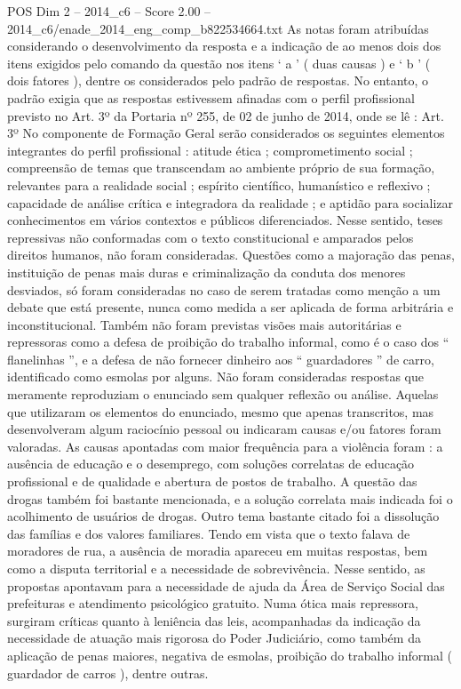\begin{textsample}{POS Dim 2 – 2014\_c6 – Score 2.00 – 2014\_c6/enade\_2014\_eng\_comp\_b822534664.txt}
As notas foram atribuídas considerando o desenvolvimento da resposta e a indicação de ao menos dois dos itens exigidos pelo comando da questão nos itens ‘ a ’ ( duas causas ) e ‘ b ’ ( dois fatores ), dentre os considerados pelo padrão de respostas.
No entanto, o padrão exigia que as respostas estivessem afinadas com o perfil profissional previsto no Art. 3º da Portaria nº 255, de 02 de junho de 2014, onde se lê : Art. 3º No componente de Formação Geral serão considerados os seguintes elementos integrantes do perfil profissional : atitude ética ; comprometimento social ; compreensão de temas que transcendam ao ambiente próprio de sua formação, relevantes para a realidade social ; espírito científico, humanístico e reflexivo ; capacidade de análise crítica e integradora da realidade ; e aptidão para socializar conhecimentos em vários contextos e públicos diferenciados.
Nesse sentido, teses repressivas não conformadas com o texto constitucional e amparados pelos direitos humanos, não foram consideradas.
Questões como a majoração das penas, instituição de penas mais duras e criminalização da conduta dos menores desviados, só foram consideradas no caso de serem tratadas como menção a um debate que está presente, nunca como medida a ser aplicada de forma arbitrária e inconstitucional.
Também não foram previstas visões mais autoritárias e repressoras como a defesa de proibição do trabalho informal, como é o caso dos “ flanelinhas ”, e a defesa de não fornecer dinheiro aos “ guardadores ” de carro, identificado como esmolas por alguns.
Não foram consideradas respostas que meramente reproduziam o enunciado sem qualquer reflexão ou análise.
Aquelas que utilizaram os elementos do enunciado, mesmo que apenas transcritos, mas desenvolveram algum raciocínio pessoal ou indicaram causas e/ou fatores foram valoradas.
As causas apontadas com maior frequência para a violência foram : a ausência de educação e o desemprego, com soluções correlatas de educação profissional e de qualidade e abertura de postos de trabalho.
A questão das drogas também foi bastante mencionada, e a solução correlata mais indicada foi o acolhimento de usuários de drogas.
Outro tema bastante citado foi a dissolução das famílias e dos valores familiares.
Tendo em vista que o texto falava de moradores de rua, a ausência de moradia apareceu em muitas respostas, bem como a disputa territorial e a necessidade de sobrevivência.
Nesse sentido, as propostas apontavam para a necessidade de ajuda da Área de Serviço Social das prefeituras e atendimento psicológico gratuito.
Numa ótica mais repressora, surgiram críticas quanto à leniência das leis, acompanhadas da indicação da necessidade de atuação mais rigorosa do Poder Judiciário, como também da aplicação de penas maiores, negativa de esmolas, proibição do trabalho informal ( guardador de carros ), dentre outras.

\end{textsample}
